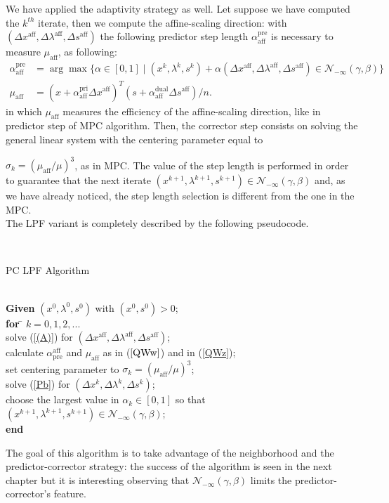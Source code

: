 \documentclass[a4paper,10 pt,titlepage,twoside]{book}
\theoremstyle{plain}
\theoremstyle{definition}
\theoremstyle{remark}
\begin{document}
{{We have applied the adaptivity strategy as well. Let suppose we have computed the $k^{th}$ iterate, then we compute the affine-scaling direction: with $(\Delta x^{\text{aff}},\Delta \lambda^{\text{aff}},\Delta s^{\text{aff}})$ the following predictor step length $\alpha_{\text{aff}}^{\text{pre}}$ is necessary to measure $\mu_{\text{aff}}$, as following:
\begin{align}
\alpha_{\text{aff}}^{\text{pre}}&=\arg\max\{\alpha\in[0,1]\;|\;(x^{k}, \lambda^{k}, s^{k})+ \alpha(\Delta x^{\text{aff}}, \Delta\lambda^{\text{aff}}, \Delta s^{\text{aff}})\in\mathcal{N}_{-\infty}(\gamma,\beta)\}\label{QWw}\\
\mu_{\text{aff}}&= (x+\alpha_{\text{aff}}^{\text{pri}}\Delta x^{\text{aff}})^{T}(s+\alpha_{\text{aff}}^{\text{dual}}\Delta s^{\text{aff}})/n.\label{QWz}
\end{align}
in which $\mu_{\text{aff}}$ measures the efficiency of the affine-scaling direction, like in predictor step of MPC algorithm.
Then, the corrector step consists on solving the general linear system with the centering parameter equal to \begin{center*}
$\sigma_{k} = (\mu_{\text{aff}}/\mu)^{3}$, as in MPC. The value of the step length is performed in order to guarantee that the next iterate $(x^{k+1}, \lambda^{k+1}, s^{k+1})\in\mathcal{N}_{-\infty}(\gamma,\beta)$ and, as we have already noticed, the step length selection is different from the one in the MPC.\\The LPF variant is completely described by the following pseudocode.
\end{center*}\\
\begin{algorithm}[H]\caption{\label{alg:pc}PC LPF Algorithm}
	\begin{tabbing}
		\\
		\textbf{Given} $(x^{0}, \lambda^{0}, s^{0})$ with $(x^{0}, s^{0})> 0$; \\
		\textbf{for} \= $k = 0, 1, 2,...$ \\
		\> solve (\ref{(A)}) for $(\Delta x^{\text{aff}},\Delta \lambda^{\text{aff}},\Delta s^{\text{aff}})$;\\
		\> calculate $\alpha_{\text{pre}}^{\text{aff}}$ and $\mu_{\text{aff}}$ as in ($\ref{QWw}$) and in (\ref{QWz});\\
		\> set centering parameter to $\sigma_{k} = (\mu_{\text{aff}}/\mu)^{3}$; \\
		\> solve (\ref{Pb}) for $(\Delta x^{k},\Delta \lambda^{k},\Delta s^{k})$;\\
		\> choose the largest value in $\alpha_{k}\in[0,1]$ so that $(x^{k+1}, \lambda^{k+1}, s^{k+1})\in\mathcal{N}_{-\infty}(\gamma,\beta)$;\\
		\textbf{end}
	\end{tabbing}
\end{algorithm}
The goal of this algorithm is to take advantage of the neighborhood and the predictor-corrector strategy: the success of the algorithm is seen in the next chapter but it is interesting observing that $\mathcal{N}_{-\infty}(\gamma,\beta)$ limits the predictor-corrector's feature.
\newpage
}}
\end{document}
